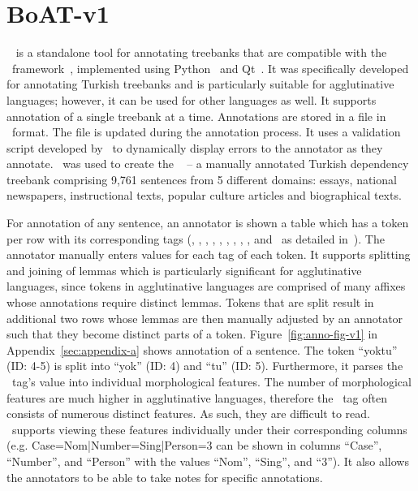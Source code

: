\section{BoAT-v1}
\label{sec:boatvone}

\boatvone~\cite{turk-etal-2019-turkish} is a standalone tool for annotating treebanks that are compatible with the \ud\ framework~\cite{UD}, implemented using Python~\cite{python} and Qt~\cite{qt}.
It was specifically developed for annotating Turkish treebanks and is particularly suitable for agglutinative languages; however, it can be used for other languages as well.
It supports annotation of a single treebank at a time.
Annotations are stored in a file in \conllu\ format.
The file is updated during the annotation process.
It uses a validation script developed by \ud\ to dynamically display errors to the annotator as they annotate.
\boatvone\ was used to create the \bountreebank~\cite{turk2021resources} -- a manually annotated Turkish dependency treebank comprising 9,761 sentences from 5 different domains: essays, national newspapers, instructional texts, popular culture articles and biographical texts.

For annotation of any sentence, an annotator is shown a table which has a token per row with its corresponding tags (\id, \form, \udlemma, \upos, \xpos, \feats, \head, \deprel, \deps, and \misc\ as detailed in~\cite{turk-etal-2019-turkish}).
The annotator manually enters values for each tag of each token.
It supports splitting and joining of lemmas which is particularly significant for agglutinative languages, since tokens in agglutinative languages are comprised of many affixes whose annotations require distinct lemmas.
Tokens that are split result in additional two rows whose lemmas are then manually adjusted by an annotator such that they become distinct parts of a token.
Figure~\ref{fig:anno-fig-v1} in Appendix~\ref{sec:appendix-a} shows annotation of a sentence.
The token ``yoktu'' (ID: 4-5) is split into ``yok'' (ID: 4) and ``tu'' (ID: 5). 
Furthermore, it parses the \feats\ tag's value into individual morphological features.
The number of morphological features are much higher in agglutinative languages, therefore the \feats\ tag often consists of numerous distinct features.
As such, they are difficult to read.
\boatvone\ supports viewing these features individually under their corresponding columns (e.g. Case=Nom|Number=Sing|Person=3 can be shown in columns ``Case'', ``Number'', and ``Person'' with the values ``Nom'', ``Sing'', and ``3'').
It also allows the annotators to be able to take notes for specific annotations.
